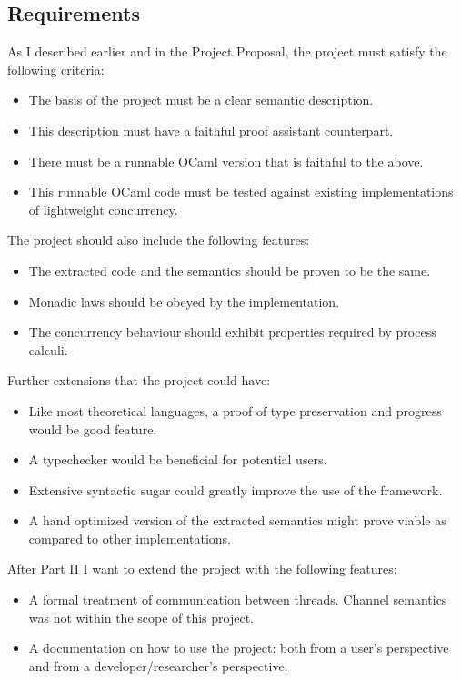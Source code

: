 \documentclass[12pt,twoside,notitlepage]{report}
\theoremstyle{plain}%
\theoremstyle{definition}
\theoremstyle{remark}
\begin{document}
\subsection{Requirements}
As I described earlier and in the Project Proposal, the project must satisfy the following criteria:
\begin{itemize}
\item{The basis of the project must be a clear semantic description.}
\item{This description must have a faithful proof assistant counterpart.}
\item{There must be a runnable OCaml version that is faithful to the above.}
\item{This runnable OCaml code must be tested against existing implementations of lightweight concurrency.}
\end{itemize}
The project should also include the following features:
\begin{itemize}
\item{The extracted code and the semantics should be proven to be the same.}
\item{Monadic laws should be obeyed by the implementation.}
\item{The concurrency behaviour should exhibit properties required by process calculi.}
\end{itemize}
Further extensions that the project could have:
\begin{itemize}
\item{Like most theoretical languages, a proof of type preservation and progress would be good feature.}
\item{A typechecker would be beneficial for potential users.}
\item{Extensive syntactic sugar could greatly improve the use of the framework.}
\item{A hand optimized version of the extracted semantics might prove viable as compared to other implementations.}
\end{itemize}
After Part II I want to extend the project with the following features:
\begin{itemize}
\item{A formal treatment of communication between threads. Channel semantics was not within the scope of this project.}
\item{A documentation on how to use the project: both from a user's perspective and from a developer/researcher's perspective.}
\end{itemize}
\end{document}
